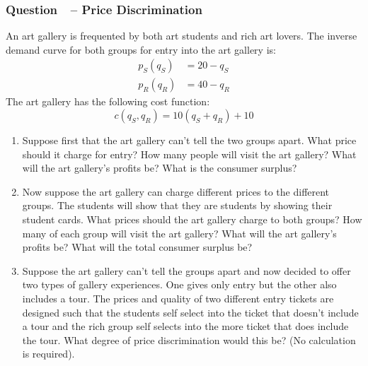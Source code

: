 \documentclass[12pt]{article}
\newcounter{question}[section]
\newcommand{\question}[1]{\refstepcounter{question}
  \subsubsection*{Question~\thequestion~-- #1}}
\newenvironment{subquestions}{
  \begin{enumerate}[label=(\roman*)]}{\end{enumerate}}
\begin{document}
\question{Price Discrimination}
An art gallery is frequented by both art students and rich art lovers.
The inverse demand curve for both groups for entry into the art gallery is:
\begin{align*}
  p_S\left( q_S \right) &= 20-q_S \\
  p_R\left( q_R \right) &= 40-q_R
\end{align*}
The art gallery has the following cost function:
\[
  c\left( q_S,q_R \right)=10\left(q_S + q_R\right) +10
\]
\begin{subquestions}
  \item Suppose first that the art gallery can't tell the
    two groups apart. What price should it charge for entry? How many people
    will visit the art gallery? What will the art gallery's profits be?
    What is the consumer surplus?
  \item Now suppose the art gallery can charge different
    prices to the different groups. The students will show that they are
    students by showing their student cards. What prices should the art gallery
    charge to both groups? How many of each group will visit the art gallery?
    What will the art gallery's profits be? What will the total consumer
    surplus be?
  \item Suppose the art gallery can't tell the groups apart
    and now decided to offer two types of gallery experiences. One gives only
    entry but the other also includes a tour. The prices and quality of two
    different entry tickets are designed such that the students self select
    into the ticket that doesn't include a tour and the rich group self selects
    into the more ticket that does include the tour. What degree of price
    discrimination would this be? (No calculation is required).
\end{subquestions}
\end{document}

